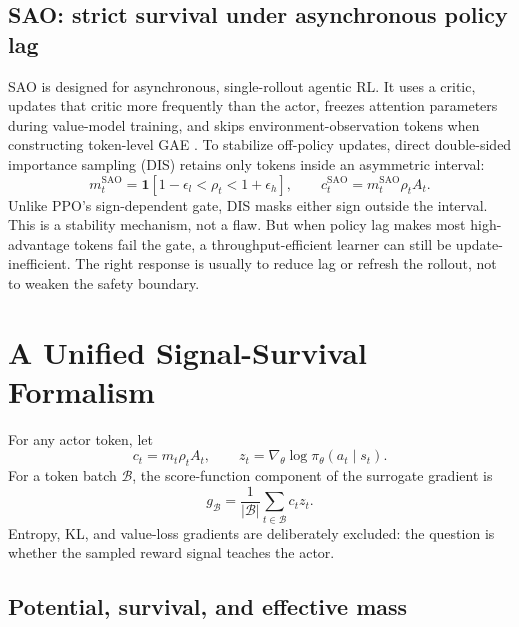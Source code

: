 \documentclass{article}
\newcommand{\ind}{\mathbf{1}}
\begin{document}
\subsection{SAO: strict survival under asynchronous policy lag}

SAO is designed for asynchronous, single-rollout agentic RL.  It uses a
critic, updates that critic more frequently than the actor, freezes attention
parameters during value-model training, and skips environment-observation
tokens when constructing token-level GAE \citep{hou2026sao}.  To stabilize
off-policy updates, direct double-sided importance sampling (DIS) retains only
tokens inside an asymmetric interval:
\begin{equation}
  m_t^{\mathrm{SAO}}=\ind\!\left[1-\epsilon_l < \rho_t < 1+\epsilon_h\right],
  \qquad
  c_t^{\mathrm{SAO}}=m_t^{\mathrm{SAO}}\rho_t A_t.
  \label{eq:sao-gate}
\end{equation}
Unlike PPO's sign-dependent gate, DIS masks either sign outside the interval.
This is a stability mechanism, not a flaw.  But when policy lag makes most
high-advantage tokens fail the gate, a throughput-efficient learner can still
be update-inefficient.  The right response is usually to reduce lag or refresh
the rollout, not to weaken the safety boundary.

\section{A Unified Signal-Survival Formalism}
\label{sec:formalism}

For any actor token, let
\begin{equation}
  c_t=m_t\rho_t A_t,
  \qquad
  z_t=\nabla_\theta\log\pi_\theta(a_t\mid s_t).
  \label{eq:coefficient}
\end{equation}
For a token batch $\mathcal{B}$, the score-function component of the surrogate
gradient is
\begin{equation}
  g_{\mathcal{B}}=\frac{1}{|\mathcal{B}|}
  \sum_{t\in\mathcal{B}}c_t z_t.
  \label{eq:gradient}
\end{equation}
Entropy, KL, and value-loss gradients are deliberately excluded: the question
is whether the sampled reward signal teaches the actor.

\subsection{Potential, survival, and effective mass}
\end{document}
